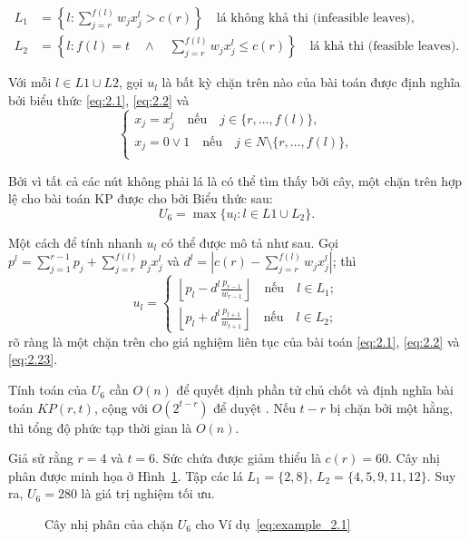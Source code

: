\begin{align*}
    L_1 &= \left\{l: \sum_{j = r}^{f(l)} w_jx_j^l > c(r)\right\}\quad\text{lá không khả thi (infeasible leaves)},\\
    L_2 &= \left\{l:f(l) = t \quad\wedge\quad \sum_{j = r}^{f(l)}w_jx_j^l \leq c(r) \right\}\quad\text{lá khả thi (feasible leaves)}.
\end{align*}

Với mỗi $l \in L1 \cup L2$, gọi $u_l$ là bất kỳ chặn trên nào của bài toán được định nghĩa bởi biểu thức \eqref{eq:2.1}, \eqref{eq:2.2} và 
\begin{equation}
    \label{eq:2.23}
    \begin{cases}
        x_j = x_j^l \quad\text{nếu}\quad j \in \{r, \dots, f(l)\},\\
        x_j = 0 \vee 1 \quad\text{nếu}\quad j \in N\setminus\{r, \dots, f(l)\},\\
    \end{cases}
\end{equation}

Bởi vì tất cả các nút không phải lá là có thể tìm thấy bởi cây, một chặn trên hợp lệ cho bài toán KP được cho bởi Biểu thức sau:
\begin{equation}
    \label{eq:2.24}
    U_6 = \max\{u_l: l \in L1 \cup L_2\}.
\end{equation}

Một cách để tính nhanh $u_l$ có thể được mô tả như sau. Gọi $p^l = \sum_{j=1}^{r-1}p_j + \sum_{j=r}^{f(l)}p_jx_j^l$ và $d^l = |c(r) - \sum_{j=r}^{f(l)}w_jx_j^l|$; thì
\begin{equation}
    \label{eq:2.25}
    u_l = \begin{cases}
        \left \lfloor p_l - d^l\frac{p_{r-1}}{w_{r-1}} \right \rfloor\quad\text{nếu}\quad l \in L_1;\\
         \left \lfloor p_l + d^l\frac{p_{t+1}}{w_{t+1}} \right \rfloor\quad\text{nếu}\quad l \in L_2;
    \end{cases}
\end{equation}
rõ ràng là một chặn trên cho giá nghiệm liên tục của bài toán \eqref{eq:2.1}, \eqref{eq:2.2} và \eqref{eq:2.23}.

Tính toán của $U_6$ cần $O(n)$ để quyết định phần tử chủ chốt và định nghĩa bài toán $KP(r, t)$, cộng với $O(2^{t-r})$ để duyệt . Nếu $t - r$ bị chặn bởi một hằng, thì tổng độ phức tạp thời gian là $O(n)$.


\begin{example}
    Giả sử rằng $r = 4$ và $t = 6$. Sức chứa được giảm thiểu là $c(r) = 60$. Cây nhị phân được minh họa ở Hình~\ref{fig:bound_u6_ex2.1}. Tập các lá $L_1 = \{2, 8\}$, $L_2 = \{4, 5, 9, 11, 12\}$. Suy ra, $U_6 = 280$ là giá trị nghiệm tối ưu.
    \begin{figure}[H]
        \centering
        
        \caption{Cây nhị phân của chặn $U_6$ cho Ví dụ~\ref{eq:example_2.1}}
        \label{fig:bound_u6_ex2.1}
    \end{figure}
\end{example}

